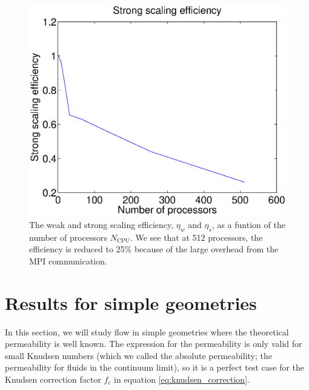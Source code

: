 \begin{figure}[h]
\begin{center}
\includegraphics[width=\textwidth, trim=0cm 0cm 0cm 0cm, clip]{DSMC/figures/strong_scaling.eps}
\end{center}
\caption{The weak and strong scaling efficiency, $\eta_w$ and $\eta_s$, as a funtion of the number of processors $N_\text{CPU}$. We see that at 512 processors, the efficiency is reduced to 25\% because of the large overhead from the MPI communication.}
\label{fig:dsmc_strong_scaling}
\end{figure}
\section{Results for simple geometries}
\label{sec:results_for_simple_geometries}
In this section, we will study flow in simple geometries where the theoretical permeability is well known. The expression for the permeability is only valid for small Knudsen numbers (which we called the absolute permeability; the permeability for fluids in the continuum limit), so it is a perfect test case for the Knudsen correction factor $f_c$ in equation \eqref{eq:knudsen_correction}. 

